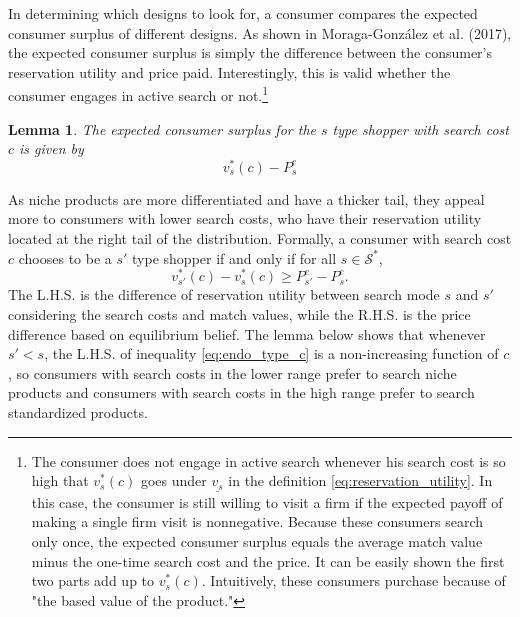 \documentclass[14pt]{article}
\theoremstyle{plain}
\newtheorem{lemma}[thm]{Lemma}
\theoremstyle{definition}
\theoremstyle{remark}
\DeclareRobustCommand\1{\futurelet\oneNext\oneCheck}
\renewcommand{\S}{\mathcal{S}}
\begin{document}
In determining which designs to look for, a consumer compares the expected consumer surplus of different designs. As shown in Moraga-Gonz{\' a}lez et al. (2017), the expected consumer surplus is simply the difference between the consumer's reservation utility and price paid. Interestingly, this is valid whether the consumer engages in active search or not.\footnote{The consumer does not engage in active search whenever his search cost is so high that $v_s^*(c)$ goes under $\underline{v_s}$ in the definition \eqref{eq:reservation_utility}. In this case, the consumer is still willing to visit a firm if the expected payoff of making a single firm visit is nonnegative. Because these consumers search only once, the expected consumer surplus equals the average match value minus the one-time search cost and the price. It can be easily shown the first two parts add up to $v_s^*(c)$. Intuitively, these consumers purchase because of "the based value of the product."}

\begin{lemma}\label{Lemma:CS}
The expected consumer surplus for the $s$ type shopper with search cost $c$ is given by
\begin{equation}\label{eq:CS}
v_s^*(c)-P_s^e    
\end{equation} 
\end{lemma}


As niche products are more differentiated and have a thicker tail, they appeal more to consumers with lower search costs, who have their reservation utility located at the right tail of the distribution. Formally, a consumer with search cost $c$ chooses to be a $s'$ type shopper if and only if for all $s\in\S^*$,
\begin{equation}\label{eq:endo_type_c}
    v_{s'}^*(c)-v_{s}^*(c)\geq P_{s'}^e-P_{s}^e. 
\end{equation}
The L.H.S. is the difference of reservation utility between search mode $s$ and $s'$ considering the search costs and match values, while the R.H.S. is the price difference based on equilibrium belief.  The lemma below shows that whenever $s'<s$, the L.H.S. of inequality  \eqref{eq:endo_type_c} is a non-increasing function of $c$, so consumers with search costs in the lower range prefer to search niche products and consumers with search costs in the high range prefer to search standardized products.
\end{document}
